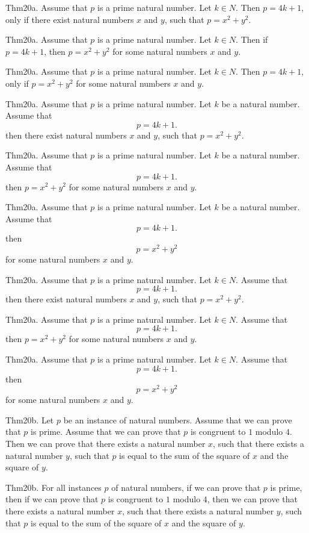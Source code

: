 \documentclass{article}
\begin{document}
Thm20a. Assume that $p$ is a prime natural number. Let $k \in N$. Then $p = 4 k + 1$, only if there exist natural numbers $x$ and $y$, such that $p = x ^{ 2}+ y ^{ 2}$.

Thm20a. Assume that $p$ is a prime natural number. Let $k \in N$. Then if $p = 4 k + 1$, then $p = x ^{ 2}+ y ^{ 2}$ for some natural numbers $x$ and $y$.

Thm20a. Assume that $p$ is a prime natural number. Let $k \in N$. Then $p = 4 k + 1$, only if $p = x ^{ 2}+ y ^{ 2}$ for some natural numbers $x$ and $y$.

Thm20a. Assume that $p$ is a prime natural number. Let $k$ be a natural number. Assume that $$p = 4 k + 1.$$ then there exist natural numbers $x$ and $y$, such that $p = x ^{ 2}+ y ^{ 2}$.

Thm20a. Assume that $p$ is a prime natural number. Let $k$ be a natural number. Assume that $$p = 4 k + 1.$$ then $p = x ^{ 2}+ y ^{ 2}$ for some natural numbers $x$ and $y$.

Thm20a. Assume that $p$ is a prime natural number. Let $k$ be a natural number. Assume that $$p = 4 k + 1.$$ then $$p = x ^{ 2}+ y ^{ 2}$$ for some natural numbers $x$ and $y$.

Thm20a. Assume that $p$ is a prime natural number. Let $k \in N$. Assume that $$p = 4 k + 1.$$ then there exist natural numbers $x$ and $y$, such that $p = x ^{ 2}+ y ^{ 2}$.

Thm20a. Assume that $p$ is a prime natural number. Let $k \in N$. Assume that $$p = 4 k + 1.$$ then $p = x ^{ 2}+ y ^{ 2}$ for some natural numbers $x$ and $y$.

Thm20a. Assume that $p$ is a prime natural number. Let $k \in N$. Assume that $$p = 4 k + 1.$$ then $$p = x ^{ 2}+ y ^{ 2}$$ for some natural numbers $x$ and $y$.

Thm20b. Let $p$ be an instance of natural numbers. Assume that we can prove that $p$ is prime. Assume that we can prove that $p$ is congruent to $1$ modulo $4$. Then we can prove that there exists a natural number $x$, such that there exists a natural number $y$, such that $p$ is equal to the sum of the square of $x$ and the square of $y$.

Thm20b. For all instances $p$ of natural numbers, if we can prove that $p$ is prime, then if we can prove that $p$ is congruent to $1$ modulo $4$, then we can prove that there exists a natural number $x$, such that there exists a natural number $y$, such that $p$ is equal to the sum of the square of $x$ and the square of $y$.
\end{document}
